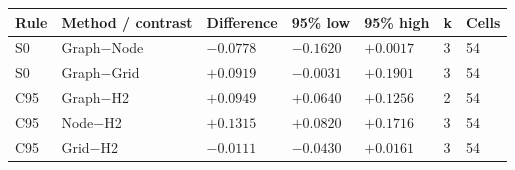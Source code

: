 \begin{tabular}{lllllll}
\hline
Rule & Method / contrast & Difference & 95\% low & 95\% high & k & Cells \\
\hline
S0 & Graph\ensuremath{-}Node & $-0.0778$ & $-0.1620$ & $+0.0017$ & 3 & 54 \\
S0 & Graph\ensuremath{-}Grid & $+0.0919$ & $-0.0031$ & $+0.1901$ & 3 & 54 \\
C95 & Graph\ensuremath{-}H2 & $+0.0949$ & $+0.0640$ & $+0.1256$ & 2 & 54 \\
C95 & Node\ensuremath{-}H2 & $+0.1315$ & $+0.0820$ & $+0.1716$ & 3 & 54 \\
C95 & Grid\ensuremath{-}H2 & $-0.0111$ & $-0.0430$ & $+0.0161$ & 3 & 54 \\
\hline
\end{tabular}
